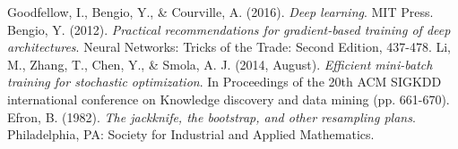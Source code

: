 \documentclass{article}
\begin{document}
\begin{thebibliography}{4}
	 Goodfellow, I., Bengio, Y., \& Courville, A. (2016). \textit{Deep learning}. MIT Press.
	 Bengio, Y. (2012). \textit{Practical recommendations for gradient-based training of deep architectures}. Neural Networks: Tricks of the Trade: Second Edition, 437-478.
	 Li, M., Zhang, T., Chen, Y., \& Smola, A. J. (2014, August). \textit{Efficient mini-batch training for stochastic optimization}. In Proceedings of the 20th ACM SIGKDD international conference on Knowledge discovery and data mining (pp. 661-670).
	 Efron, B. (1982). \textit{The jackknife, the bootstrap, and other resampling plans}. Philadelphia, PA: Society for Industrial and Applied Mathematics.
\end{thebibliography}
\end{document}
